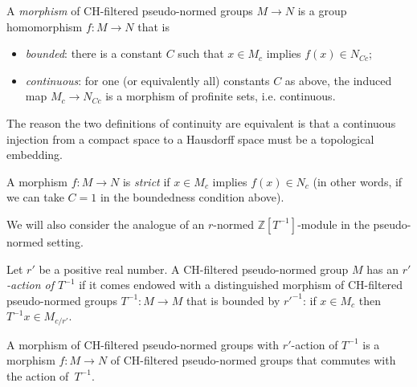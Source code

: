 \begin{definition}
  \label{chpng-hom}
  \leanok
  A \emph{morphism} of CH-filtered pseudo-normed groups $M \to N$
  is a group homomorphism $f \colon M \to N$ that is
  \begin{itemize}
    \item \emph{bounded}:
      there is a constant $C$
      such that $x \in M_c$ implies $f(x) \in N_{Cc}$;
    \item \emph{continuous}:
      for one (or equivalently all) constants $C$ as above,
      the induced map $M_c \to N_{Cc}$ is
      a morphism of profinite sets, i.e. continuous.
  \end{itemize}
  The reason the two definitions of continuity are equivalent is that a continuous injection from a compact space to a Hausdorff space must be a topological embedding.

  A morphism $f \colon M \to N$ is \emph{strict} if $x \in M_c$ implies $f(x) \in N_c$
  (in other words, if we can take $C = 1$ in the boundedness condition above).
\end{definition}

We will also consider the analogue of an $r$-normed $\mathbb Z[T^{-1}]$-module in the pseudo-normed setting.

\begin{definition}
  \label{chpng-Tinv}
  \leanok
  Let $r'$ be a positive real number.
  A CH-filtered pseudo-normed group $M$
  has an \emph{$r'$-action of $T^{-1}$}
  if it comes endowed with a distinguished morphism of CH-filtered pseudo-normed groups
  $T^{-1} \colon M \to M$ that is bounded by $r'^{-1}$:
  if $x \in M_c$ then $T^{-1}x \in M_{c/r'}$.

  A morphism of CH-filtered pseudo-normed groups with $r'$-action of $T^{-1}$
  is a morphism $f \colon M \to N$ of CH-filtered pseudo-normed groups that commutes with the action of~$T^{-1}$.
\end{definition}

